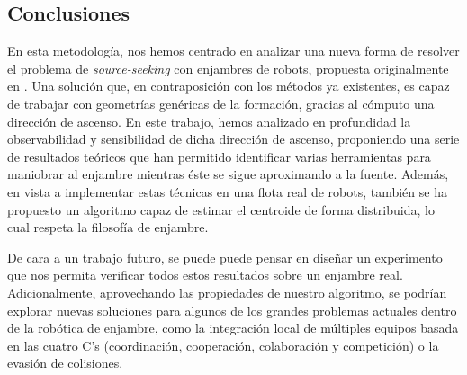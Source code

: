 
\subsection{Conclusiones}

En esta metodología, nos hemos centrado en analizar una nueva forma de resolver el problema de \textit{source-seeking} con enjambres de robots, propuesta originalmente en \cite{tfg_antonio}. Una solución que, en contraposición con los métodos ya existentes, es capaz de trabajar con geometrías genéricas de la formación, gracias al cómputo una dirección de ascenso. En este trabajo, hemos analizado en profundidad la observabilidad y sensibilidad de dicha dirección de ascenso, proponiendo una serie de resultados teóricos que han permitido identificar varias herramientas para maniobrar al enjambre mientras éste se sigue aproximando a la fuente. Además, en vista a implementar estas técnicas en una flota real de robots, también se ha propuesto un algoritmo capaz de estimar el centroide de forma distribuida, lo cual respeta la filosofía de enjambre.

De cara a un trabajo futuro, se puede puede pensar en diseñar un experimento que nos permita verificar todos estos resultados sobre un enjambre real. Adicionalmente, aprovechando las propiedades de nuestro algoritmo, se podrían explorar nuevas soluciones para algunos de los grandes problemas actuales dentro de la robótica de enjambre, como la integración local de múltiples equipos basada en las cuatro C's (coordinación, cooperación, colaboración y competición) o la evasión de colisiones.

